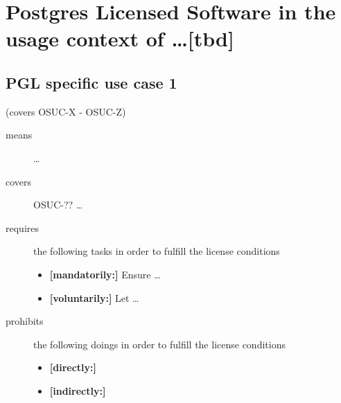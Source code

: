 %
%
%
%
%



\section{Postgres Licensed Software in the usage context of \ldots [tbd]}

\label{OSUC-01-PGL} \label{OSUC-03-PGL} 
\label{OSUC-06-PGL} \label{OSUC-09-PGL}

\label{OSUC-02-PGL} \label{OSUC-04-PGL} \label{OSUC-05-PGL}
\label{OSUC-07-PGL} \label{OSUC-08-PGL} \label{OSUC-10-PGL}


\subsection{PGL specific use case 1}
(covers OSUC-X - OSUC-Z)
\begin{description}
\item[means] \ldots

\item[covers] OSUC-?? \ldots

\item[requires] the following tasks in order to fulfill the license conditions
\begin{itemize}
  \item \textbf{[mandatorily:]} Ensure \ldots
  \item \textbf{[voluntarily:]} Let \ldots
\end{itemize}

\item[prohibits] the following doings in order to fulfill the license conditions
\begin{itemize}
  \item \textbf{[directly:]} 
  \item \textbf{[indirectly:]}
\end{itemize}
\end{description}

